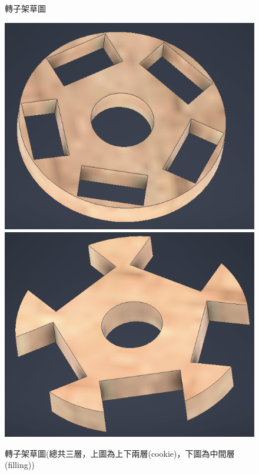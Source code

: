 \documentclass[12pt,a4paper]{article}
\begin{document}
\begin{CJK*}{UTF8}{bkai}
\begin{enumerate}
\begin{figure}[h]
                  \caption{轉子架草圖}
              \end{figure}
              \begin{figure}[h]
                  \centering
                  \includegraphics[height=0.2\textheight]{./images/cookie_3d.png}
                  \includegraphics[height=0.2\textheight]{./images/filling_3d.png}
                  \caption{轉子架草圖(總共三層，上圖為上下兩層(cookie)，下圖為中間層(filling))}
              \end{figure}
              \begin{figure}[H]

\end{figure}
\end{enumerate}
\end{CJK*}
\end{document}
